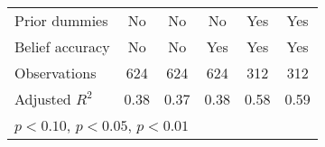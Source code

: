 {\begin{tabular}{l*{5}{c}}
Prior dummies   &       No         &       No         &       No         &      Yes         &      Yes         \\
Belief accuracy &       No         &       No         &      Yes         &      Yes         &      Yes         \\
\hline
Observations    &      624         &      624         &      624         &      312         &      312         \\
Adjusted \(R^{2}\)&     0.38         &     0.37         &     0.38         &     0.58         &     0.59         \\
\hline\hline
\multicolumn{6}{l}{\footnotesize \sym{*} \(p<0.10\), \sym{**} \(p<0.05\), \sym{***} \(p<0.01\)}\\
\end{tabular}
}
